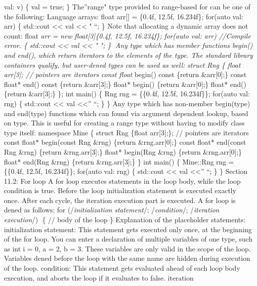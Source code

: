 val: v) \{ val = true; \} The''range" type provided to range-based for
can be one of the following: Language arrays: float arr{[}{]} = \{0.4f,
12.5f, 16.234f\}; for(auto val: arr) \{ std::cout \textless\textless{}
val \textless\textless{} " ``; \} Note that allocating a dynamic array
does not count: float \emph{arr = new float{[}3{]}\{0.4f, 12.5f,
16.234f\}; for(auto val: arr) //Compile error. \{ std::cout
\textless\textless{} val \textless\textless{} " "; \} Any type which
has member functions begin() and end(), which return iterators to the
elements of the type. The standard library containers qualify, but
user-dened types can be used as well: struct Rng \{ float arr{[}3{]}; //
pointers are iterators const float} begin() const \{return
\&arr{[}0{]};\} const float* end() const \{return \&arr{[}3{]};\} float*
begin() \{return \&arr{[}0{]};\} float* end() \{return \&arr{[}3{]};\}
\}; int main() \{ Rng rng = \{\{0.4f, 12.5f, 16.234f\}\}; for(auto val:
rng) \{ std::cout \textless\textless{} val \textless\textless{}'' ``; \}
\} Any type which has non-member begin(type) and end(type) functions
which can found via argument dependent lookup, based on type. This is
useful for creating a range type without having to modify class type
itself: namespace Mine \{ struct Rng \{float arr{[}3{]};\}; // pointers
are iterators const float* begin(const Rng \&rng) \{return
\&rng.arr{[}0{]};\} const float* end(const Rng \&rng) \{return
\&rng.arr{[}3{]};\} float* begin(Rng \&rng) \{return \&rng.arr{[}0{]};\}
float* end(Rng \&rng) \{return \&rng.arr{[}3{]};\} \} int main() \{
Mine::Rng rng = \{\{0.4f, 12.5f, 16.234f\}\}; for(auto val: rng) \{
std::cout \textless\textless{} val \textless\textless{}'' ``; \} \}
Section 11.2: For loop A for loop executes statements in the loop body,
while the loop condition is true. Before the loop initialization
statement is executed exactly once. After each cycle, the iteration
execution part is executed. A for loop is dened as follows: for
(/\emph{initialization statement}/; /\emph{condition}/; /\emph{iteration
execution}/) \{ // body of the loop \} Explanation of the placeholder
statements: initialization statement: This statement gets executed only
once, at the beginning of the for loop. You can enter a declaration of
multiple variables of one type, such as int i = 0, a = 2, b = 3. These
variables are only valid in the scope of the loop. Variables dened
before the loop with the same name are hidden during execution of the
loop. condition: This statement gets evaluated ahead of each loop body
execution, and aborts the loop if it evaluates to false. iteration
